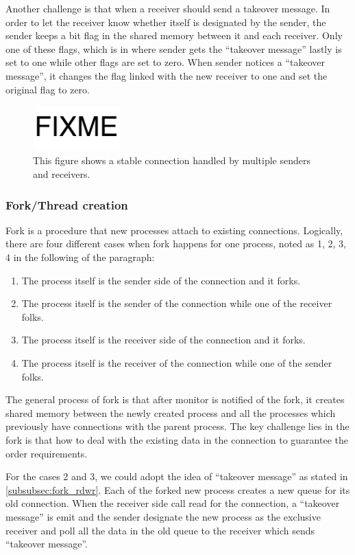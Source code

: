 Another challenge is that when a receiver should send a takeover message. In order to let the receiver know whether itself is designated by the sender, the sender keeps a bit flag in the shared memory between it and each receiver.  Only one of these flags, which is in where sender gets the ``takeover message'' lastly is set to one while other flags are set to zero. When sender notices a ``takeover message'', it changes the flag linked with the new receiver to one and set the original flag to zero.


\begin{figure}[t]
	\centering
	\includegraphics[width=0.3\textwidth]{images/fixme}
	\caption{This figure shows a stable connection handled by multiple senders and receivers.}
	\label{fig:fork-bipartitegraph}
\end{figure}

\subsubsection{Fork/Thread creation}
Fork is a procedure that new processes attach to existing connections. Logically, there are four different cases when fork happens for one process, noted as 1, 2, 3, 4 in the following of the paragraph:
\begin{enumerate}
	\item The process itself is the sender side of the connection and it forks.
	\item The process itself is the sender of the connection while one of the receiver folks.
	\item The process itself is the receiver side of the connection and it forks.
	\item The process itself is the receiver of the connection while one of the sender folks.
\end{enumerate}

The general process of fork is that after monitor is notified of the fork, it creates shared memory between the newly created process and all the processes which previously have connections with the parent process. The key challenge lies in the fork is that how to deal with the existing data in the connection to guarantee the order requirements.

For the cases 2 and 3, we could adopt the idea of ``takeover message'' as stated in \ref{subsubsec:fork_rdwr}. Each of the forked new process creates a new queue for its old connection. When the receiver side call read for the connection, a ``takeover message'' is emit and the sender designate the new process as the exclusive receiver and poll all the data in the old queue to the receiver which sends ``takeover message''.

